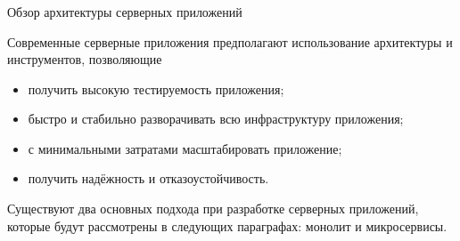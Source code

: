 \subsubsection{} Обзор архитектуры серверных приложений
\label{sec:analysis:research:mobArch}

Современные серверные приложения предполагают использование архитектуры и инструментов, позволяющие

\begin{itemize}
\item получить высокую тестируемость приложения;
\item быстро и стабильно разворачивать всю инфраструктуру приложения;
\item с минимальными затратами масштабировать приложение;
\item получить надёжность и отказоустойчивость.
\end{itemize}

Существуют два основных подхода при разработке серверных приложений, которые будут рассмотрены в следующих параграфах: монолит и микросервисы.



